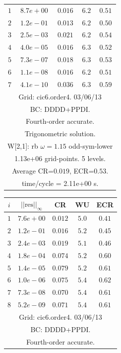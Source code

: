 \begin{table}[hbt]
\begin{center}
{\begin{tabular}{|c|c|c|c|c|}
 $ 1$  & $ 8.7e+00$ & $0.016$ & $ 6.2$ & $0.51$ \\ 
 $ 2$  & $ 1.2e-01$ & $0.013$ & $ 6.2$ & $0.50$ \\ 
 $ 3$  & $ 2.5e-03$ & $0.021$ & $ 6.2$ & $0.54$ \\ 
 $ 4$  & $ 4.0e-05$ & $0.016$ & $ 6.3$ & $0.52$ \\ 
 $ 5$  & $ 7.3e-07$ & $0.018$ & $ 6.3$ & $0.53$ \\ 
 $ 6$  & $ 1.1e-08$ & $0.016$ & $ 6.2$ & $0.51$ \\ 
 $ 7$  & $ 4.1e-10$ & $0.036$ & $ 6.3$ & $0.59$ \\ 
\hline 
\multicolumn{5}{|c|}{Grid: cic6.order4. 03/06/13}  \\
\multicolumn{5}{|c|}{BC: DDDD+PPDI.}  \\
\multicolumn{5}{|c|}{Fourth-order accurate.}  \\
\multicolumn{5}{|c|}{Trigonometric solution.}  \\
\multicolumn{5}{|c|}{W[2,1]: rb $\omega=1.15$ odd-sym-lower}  \\
\multicolumn{5}{|c|}{1.13e+06 grid-points. 5 levels.}  \\
\multicolumn{5}{|c|}{Average CR=$0.019$, ECR=$0.53$.}  \\
\multicolumn{5}{|c|}{time/cycle = 2.11e+00 s.}  \\
\hline 
\end{tabular}
\begin{tabular}{|c|c|c|c|c|} \hline 
 $i$   & $\vert\vert\mbox{res}\vert\vert_\infty$  &  CR     &  WU    & ECR  \\   \hline 
 $ 1$  & $ 7.6e+00$ & $0.012$ & $ 5.0$ & $0.41$ \\ 
 $ 2$  & $ 1.2e-01$ & $0.016$ & $ 5.2$ & $0.45$ \\ 
 $ 3$  & $ 2.4e-03$ & $0.019$ & $ 5.1$ & $0.46$ \\ 
 $ 4$  & $ 1.8e-04$ & $0.074$ & $ 5.2$ & $0.60$ \\ 
 $ 5$  & $ 1.4e-05$ & $0.079$ & $ 5.2$ & $0.61$ \\ 
 $ 6$  & $ 1.0e-06$ & $0.075$ & $ 5.4$ & $0.62$ \\ 
 $ 7$  & $ 7.3e-08$ & $0.070$ & $ 5.4$ & $0.61$ \\ 
 $ 8$  & $ 5.2e-09$ & $0.071$ & $ 5.4$ & $0.61$ \\ 
\hline 
\multicolumn{5}{|c|}{Grid: cic6.order4. 03/06/13}  \\
\multicolumn{5}{|c|}{BC: DDDD+PPDI.}  \\
\multicolumn{5}{|c|}{Fourth-order accurate.}  \\

\end{tabular}}
\end{center}
\end{table}
